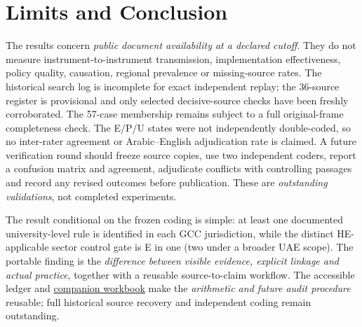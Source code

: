 \documentclass[conference,letterpaper]{IEEEtran}
\begin{document}
\section{Limits and Conclusion}
The results concern \emph{public document availability at a declared cutoff}. They do not measure instrument-to-instrument transmission, implementation effectiveness, policy quality, causation, regional prevalence or missing-source rates. The historical search log is incomplete for exact independent replay; the 36-source register is provisional and only selected decisive-source checks have been freshly corroborated. The 57-case membership remains subject to a full original-frame completeness check. The E/P/U states were not independently double-coded, so no inter-rater agreement or Arabic--English adjudication rate is claimed. A future verification round should freeze source copies, use two independent coders, report a confusion matrix and agreement, adjudicate conflicts with controlling passages and record any revised outcomes before publication. These are \emph{outstanding validations}, not completed experiments.

The result conditional on the frozen coding is simple: at least one documented university-level rule is identified in each GCC jurisdiction, while the distinct HE-applicable sector control gate is E in one (two under a broader UAE scope). The portable finding is the \emph{difference between visible evidence, explicit linkage and actual practice}, together with a reusable source-to-claim workflow. The accessible ledger and \href{https://github.com/shaikhamalkawi-ux/From-AI-Strategy-to-University-Rules-in-the-GCC/blob/main/ICAMAC2026_Paper90_R5_57/resources/ICAMAC_Paper90_R5_Reusable_Audit_Workbook.xlsx}{companion workbook} make the \emph{arithmetic and future audit procedure} reusable; full historical source recovery and independent coding remain outstanding.
\end{document}

